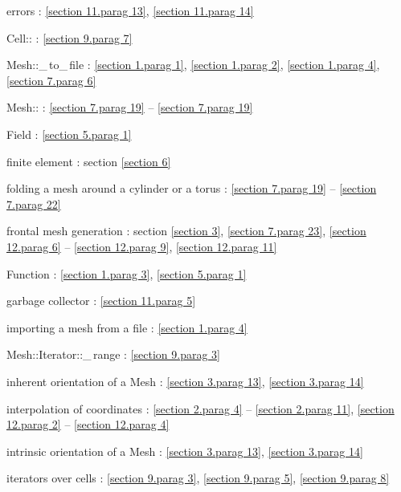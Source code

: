 \documentclass[a4paper]{scrreprt}
\def\numb{}
\newcommand\verm[1]{\textcolor{manif}{#1}}
\renewcommand\tt{\normalfont\ttfamily}
\begin{document}
\noindent
errors : \ref{\numb section 11.\numb parag 13}, \ref{\numb section 11.\numb parag 14}

\noindent
{\small\tt\verm{Cell}::} : \ref{\numb section 9.\numb parag 7}

\noindent
{\small\tt\verm{Mesh}::\_\,to\_\,file} : \ref{\numb section 1.\numb parag 1},
\ref{\numb section 1.\numb parag 2}, \ref{\numb section 1.\numb parag 4},
\ref{\numb section 7.\numb parag 6}

\noindent
{\small\tt\verm{Mesh}::} :
\ref{\numb section 7.\numb parag 19} -- \ref{\numb section 7.\numb parag 19}

\noindent
{\small\tt \verm{Field}} : \ref{\numb section 5.\numb parag 1}

\noindent
finite element : section \ref{\numb section 6}

\noindent
folding a mesh around a cylinder or a torus : \ref{\numb section 7.\numb parag 19} --
\ref{\numb section 7.\numb parag 22}

\noindent
frontal mesh generation : section \ref{\numb section 3}, \ref{\numb section 7.\numb parag 23},
\ref{\numb section 12.\numb parag 6} -- \ref{\numb section 12.\numb parag 9},
\ref{\numb section 12.\numb parag 11}

\noindent
{\small\tt \verm{Function}} : \ref{\numb section 1.\numb parag 3},
\ref{\numb section 5.\numb parag 1}

\noindent
garbage collector : \ref{\numb section 11.\numb parag 5}

\noindent
importing a mesh from a file : \ref{\numb section 1.\numb parag 4}

\noindent
{\small\tt\verm{Mesh}::Iterator::\_\,range} : \ref{\numb section 9.\numb parag 3}

\noindent
inherent orientation of a {\small\tt\verm{Mesh}} : \ref{\numb section 3.\numb parag 13},
\ref{\numb section 3.\numb parag 14}

\noindent
interpolation of coordinates :
\ref{\numb section 2.\numb parag 4} -- \ref{\numb section 2.\numb parag 11},
\ref{\numb section 12.\numb parag 2} -- \ref{\numb section 12.\numb parag 4}

\noindent
intrinsic orientation of a {\small\tt\verm{Mesh}} : \ref{\numb section 3.\numb parag 13},
\ref{\numb section 3.\numb parag 14}

\noindent
iterators over cells : \ref{\numb section 9.\numb parag 3}, \ref{\numb section 9.\numb parag 5},
\ref{\numb section 9.\numb parag 8}
\end{document}
